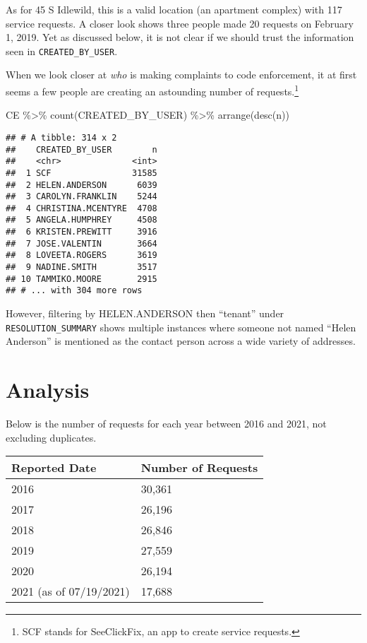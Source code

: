 \documentclass[
]{book}
\newenvironment{Shaded}{\begin{snugshade}}{\end{snugshade}}
\newcommand{\FunctionTok}[1]{\textcolor[rgb]{0.00,0.00,0.00}{#1}}
\newcommand{\NormalTok}[1]{#1}
\newcommand{\SpecialCharTok}[1]{\textcolor[rgb]{0.00,0.00,0.00}{#1}}
\begin{document}
As for 45 S Idlewild, this is a valid location (an apartment complex) with 117 service requests. A closer look shows three people made 20 requests on February 1, 2019. Yet as discussed below, it is not clear if we should trust the information seen in \texttt{CREATED\_BY\_USER}.

When we look closer at \emph{who} is making complaints to code enforcement, it at first seems a few people are creating an astounding number of requests.\footnote{SCF stands for SeeClickFix, an app to create service requests.}

\begin{Shaded}
\begin{Highlighting}[]
\NormalTok{CE }\SpecialCharTok{\%\textgreater{}\%} \FunctionTok{count}\NormalTok{(CREATED\_BY\_USER) }\SpecialCharTok{\%\textgreater{}\%} \FunctionTok{arrange}\NormalTok{(}\FunctionTok{desc}\NormalTok{(n))}
\end{Highlighting}
\end{Shaded}

\begin{verbatim}
## # A tibble: 314 x 2
##    CREATED_BY_USER        n
##    <chr>              <int>
##  1 SCF                31585
##  2 HELEN.ANDERSON      6039
##  3 CAROLYN.FRANKLIN    5244
##  4 CHRISTINA.MCENTYRE  4708
##  5 ANGELA.HUMPHREY     4508
##  6 KRISTEN.PREWITT     3916
##  7 JOSE.VALENTIN       3664
##  8 LOVEETA.ROGERS      3619
##  9 NADINE.SMITH        3517
## 10 TAMMIKO.MOORE       2915
## # ... with 304 more rows
\end{verbatim}

However, filtering by HELEN.ANDERSON then ``tenant'' under \texttt{RESOLUTION\_SUMMARY} shows multiple instances where someone not named ``Helen Anderson'' is mentioned as the contact person across a wide variety of addresses.

\hypertarget{analysis}{%
\section{Analysis}\label{analysis}}

Below is the number of requests for each year between 2016 and 2021, not excluding duplicates.

\begin{longtable}[]{@{}ll@{}}
\toprule
Reported Date & Number of Requests \\
\midrule
\endhead
2016 & 30,361 \\
2017 & 26,196 \\
2018 & 26,846 \\
2019 & 27,559 \\
2020 & 26,194 \\
2021 (as of 07/19/2021) & 17,688 \\
\bottomrule
\end{longtable}
\end{document}
